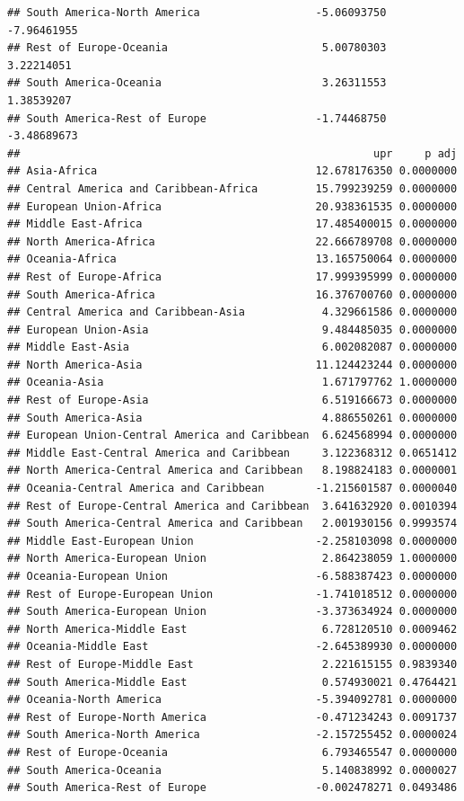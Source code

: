 \documentclass[
  10pt,
]{article}
\begin{document}
\begin{verbatim}
## South America-North America                  -5.06093750  -7.96461955
## Rest of Europe-Oceania                        5.00780303   3.22214051
## South America-Oceania                         3.26311553   1.38539207
## South America-Rest of Europe                 -1.74468750  -3.48689673
##                                                       upr     p adj
## Asia-Africa                                  12.678176350 0.0000000
## Central America and Caribbean-Africa         15.799239259 0.0000000
## European Union-Africa                        20.938361535 0.0000000
## Middle East-Africa                           17.485400015 0.0000000
## North America-Africa                         22.666789708 0.0000000
## Oceania-Africa                               13.165750064 0.0000000
## Rest of Europe-Africa                        17.999395999 0.0000000
## South America-Africa                         16.376700760 0.0000000
## Central America and Caribbean-Asia            4.329661586 0.0000000
## European Union-Asia                           9.484485035 0.0000000
## Middle East-Asia                              6.002082087 0.0000000
## North America-Asia                           11.124423244 0.0000000
## Oceania-Asia                                  1.671797762 1.0000000
## Rest of Europe-Asia                           6.519166673 0.0000000
## South America-Asia                            4.886550261 0.0000000
## European Union-Central America and Caribbean  6.624568994 0.0000000
## Middle East-Central America and Caribbean     3.122368312 0.0651412
## North America-Central America and Caribbean   8.198824183 0.0000001
## Oceania-Central America and Caribbean        -1.215601587 0.0000040
## Rest of Europe-Central America and Caribbean  3.641632920 0.0010394
## South America-Central America and Caribbean   2.001930156 0.9993574
## Middle East-European Union                   -2.258103098 0.0000000
## North America-European Union                  2.864238059 1.0000000
## Oceania-European Union                       -6.588387423 0.0000000
## Rest of Europe-European Union                -1.741018512 0.0000000
## South America-European Union                 -3.373634924 0.0000000
## North America-Middle East                     6.728120510 0.0009462
## Oceania-Middle East                          -2.645389930 0.0000000
## Rest of Europe-Middle East                    2.221615155 0.9839340
## South America-Middle East                     0.574930021 0.4764421
## Oceania-North America                        -5.394092781 0.0000000
## Rest of Europe-North America                 -0.471234243 0.0091737
## South America-North America                  -2.157255452 0.0000024
## Rest of Europe-Oceania                        6.793465547 0.0000000
## South America-Oceania                         5.140838992 0.0000027
## South America-Rest of Europe                 -0.002478271 0.0493486
\end{verbatim}
\end{document}
